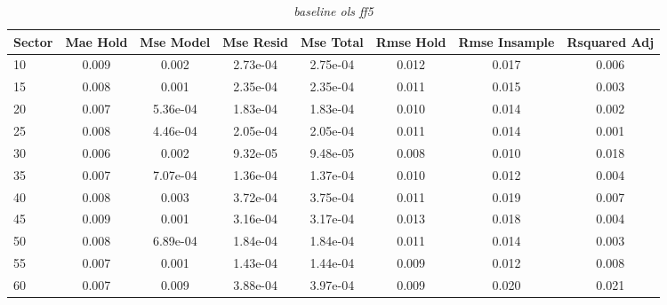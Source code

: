 \begin{table}[H]
\caption{\textit{baseline ols ff5}}\label{tab:baseline_ols_ff5}
\centering
\begin{tabular}{lccccccc}
\hline\hline
Sector & Mae Hold & Mse Model & Mse Resid & Mse Total & Rmse Hold & Rmse Insample & Rsquared Adj \\ 
\hline
10 & 0.009 & 0.002 & 2.73e-04 & 2.75e-04 & 0.012 & 0.017 & 0.006 \\ 
15 & 0.008 & 0.001 & 2.35e-04 & 2.35e-04 & 0.011 & 0.015 & 0.003 \\ 
20 & 0.007 & 5.36e-04 & 1.83e-04 & 1.83e-04 & 0.010 & 0.014 & 0.002 \\ 
25 & 0.008 & 4.46e-04 & 2.05e-04 & 2.05e-04 & 0.011 & 0.014 & 0.001 \\ 
30 & 0.006 & 0.002 & 9.32e-05 & 9.48e-05 & 0.008 & 0.010 & 0.018 \\ 
35 & 0.007 & 7.07e-04 & 1.36e-04 & 1.37e-04 & 0.010 & 0.012 & 0.004 \\ 
40 & 0.008 & 0.003 & 3.72e-04 & 3.75e-04 & 0.011 & 0.019 & 0.007 \\ 
45 & 0.009 & 0.001 & 3.16e-04 & 3.17e-04 & 0.013 & 0.018 & 0.004 \\ 
50 & 0.008 & 6.89e-04 & 1.84e-04 & 1.84e-04 & 0.011 & 0.014 & 0.003 \\ 
55 & 0.007 & 0.001 & 1.43e-04 & 1.44e-04 & 0.009 & 0.012 & 0.008 \\ 
60 & 0.007 & 0.009 & 3.88e-04 & 3.97e-04 & 0.009 & 0.020 & 0.021 \\ 
\hline
\end{tabular}
\end{table}



